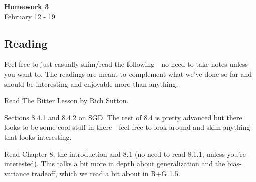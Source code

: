 \documentclass{article}
\newenvironment{envsection}[1]{\begin{trivlist}
\item[\hskip \labelsep {\bfseries #1}]}{\end{trivlist}}
\begin{document}
\setlength{\abovedisplayskip}{4pt}
\setlength{\belowdisplayskip}{4pt}


\begin{center}
    \Large{\textbf{Homework 3}}\\
    \normalsize February 12 - 19
\end{center}
\vspace{10pt}

\subsection*{Reading}

Feel free to just casually skim/read the following---no need to take notes unless you want to. The readings are meant to complement what we've done so far and should be interesting and enjoyable more than anything.

\begin{envsection}{1.}
    Read \href{http://www.incompleteideas.net/IncIdeas/BitterLesson.html}{The Bitter Lesson} by Rich Sutton.
\end{envsection}

\begin{envsection}{2. Probabilistic Machine Learning:}
    Sections 8.4.1 and 8.4.2 on SGD. The rest of 8.4 is pretty advanced but there looks to be some cool stuff in there---feel free to look around and skim anything that looks interesting.
\end{envsection}

\begin{envsection}{3. CS229 Notes:}
    Read Chapter 8, the introduction and 8.1 (no need to read 8.1.1, unless you're interested). This talks a bit more in depth about generalization and the bias-variance tradeoff, which we read a bit about in R+G 1.5.
\end{envsection}




    
\end{document}
